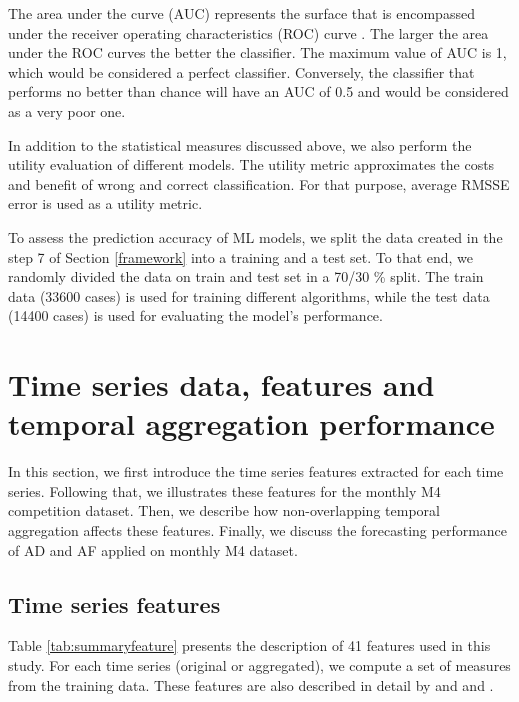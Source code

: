 \documentclass[preprint, 3p,
authoryear]{elsarticle} %
\begin{document}
The area under the curve (AUC) represents the surface that is
encompassed under the receiver operating characteristics (ROC) curve
\citep{james2021statistical}. The larger the area under the ROC curves
the better the classifier. The maximum value of AUC is 1, which would be
considered a perfect classifier. Conversely, the classifier that
performs no better than chance will have an AUC of 0.5 and would be
considered as a very poor one.

In addition to the statistical measures discussed above, we also perform
the utility evaluation of different models. The utility metric
approximates the costs and benefit of wrong and correct classification.
For that purpose, average RMSSE error is used as a utility metric.

To assess the prediction accuracy of ML models, we split the data
created in the step 7 of Section \ref{framework} into a training and a
test set. To that end, we randomly divided the data on train and test
set in a 70/30 \% split. The train data (33600 cases) is used for
training different algorithms, while the test data (14400 cases) is used
for evaluating the model's performance.

\hypertarget{tsfeatures}{%
\section{Time series data, features and temporal aggregation
performance}\label{tsfeatures}}

In this section, we first introduce the time series features extracted
for each time series. Following that, we illustrates these features for
the monthly M4 competition dataset. Then, we describe how
non-overlapping temporal aggregation affects these features. Finally, we
discuss the forecasting performance of AD and AF applied on monthly M4
dataset.

\hypertarget{time-series-features}{%
\subsection{Time series features}\label{time-series-features}}

Table \ref{tab:summaryfeature} presents the description of 41 features
used in this study. For each time series (original or aggregated), we
compute a set of measures from the training data. These features are
also described in detail by \citet{wang2009rule} and
\citet{hyndman2015large} and \citet{hyndman2021forecasting}.
\end{document}
